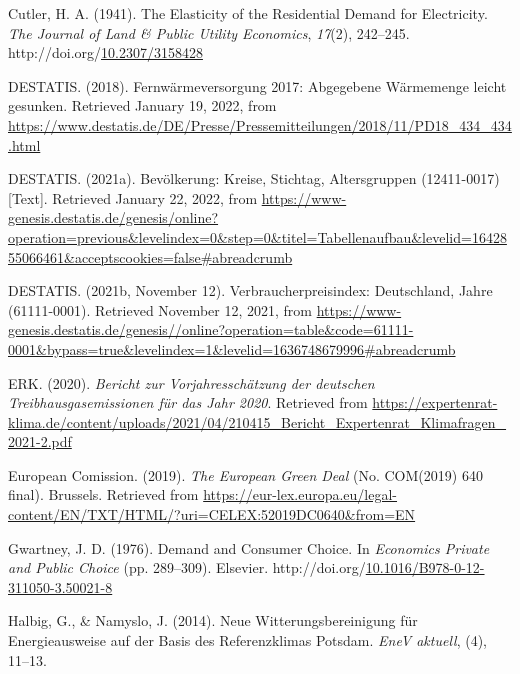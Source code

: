 \documentclass[12pt,twoside]{reedthesis}
\newlength{\cslhangindent}
\newenvironment{CSLReferences}[2] %
 {%
  \setlength{\parindent}{0pt}
  \ifodd #1 \everypar{\setlength{\hangindent}{\cslhangindent}}\ignorespaces\fi
  \ifnum #2 > 0
  \setlength{\parskip}{#2\baselineskip}
  \fi
 }%
 {}
\begin{document}
\begin{CSLReferences}{1}{0}
\leavevmode{}%
Cutler, H. A. (1941). The Elasticity of the Residential Demand for Electricity. \emph{The Journal of Land \& Public Utility Economics}, \emph{17}(2), 242--245. http://doi.org/\href{https://doi.org/10.2307/3158428}{10.2307/3158428}

\leavevmode{}%
DESTATIS. (2018). Fernwärmeversorgung 2017: Abgegebene Wärmemenge leicht gesunken. Retrieved January 19, 2022, from \url{https://www.destatis.de/DE/Presse/Pressemitteilungen/2018/11/PD18_434_434.html}

\leavevmode{}%
DESTATIS. (2021a). Bevölkerung: Kreise, Stichtag, Altersgruppen (12411-0017) {[}Text{]}. Retrieved January 22, 2022, from \url{https://www-genesis.destatis.de/genesis/online?operation=previous\&levelindex=0\&step=0\&titel=Tabellenaufbau\&levelid=1642855066461\&acceptscookies=false\#abreadcrumb}

\leavevmode{}%
DESTATIS. (2021b, November 12). Verbraucherpreisindex: Deutschland, Jahre (61111-0001). Retrieved November 12, 2021, from \url{https://www-genesis.destatis.de/genesis//online?operation=table\&code=61111-0001\&bypass=true\&levelindex=1\&levelid=1636748679996\#abreadcrumb}

\leavevmode{}%
ERK. (2020). \emph{Bericht zur Vorjahresschätzung der deutschen Treibhausgasemissionen für das Jahr 2020}. Retrieved from \url{https://expertenrat-klima.de/content/uploads/2021/04/210415_Bericht_Expertenrat_Klimafragen_2021-2.pdf}

\leavevmode{}%
European Comission. (2019). \emph{The European Green Deal} (No. COM(2019) 640 final). Brussels. Retrieved from \url{https://eur-lex.europa.eu/legal-content/EN/TXT/HTML/?uri=CELEX:52019DC0640\&from=EN}

\leavevmode{}%
Gwartney, J. D. (1976). Demand and Consumer Choice. In \emph{Economics Private and Public Choice} (pp. 289--309). Elsevier. http://doi.org/\href{https://doi.org/10.1016/B978-0-12-311050-3.50021-8}{10.1016/B978-0-12-311050-3.50021-8}

\leavevmode{}%
Halbig, G., \& Namyslo, J. (2014). Neue Witterungsbereinigung für Energieausweise auf der Basis des Referenzklimas Potsdam. \emph{EneV aktuell}, (4), 11--13.


\end{CSLReferences}
\end{document}
